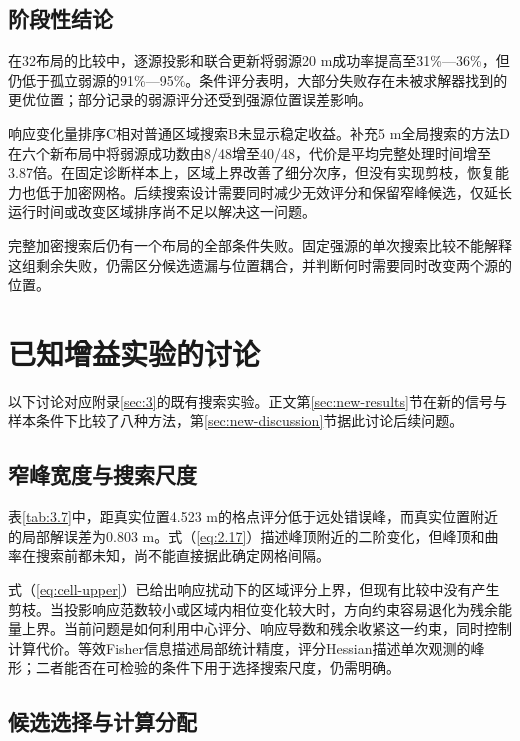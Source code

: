 \documentclass[11pt,a4paper]{article}
\numberwithin{equation}{section}
\numberwithin{figure}{section}
\numberwithin{table}{section}
\begin{document}
\subsection{阶段性结论}\label{sec:3.11}

在32布局的比较中，逐源投影和联合更新将弱源20 m成功率提高至31\%—36\%，但仍低于孤立弱源的91\%—95\%。条件评分表明，大部分失败存在未被求解器找到的更优位置；部分记录的弱源评分还受到强源位置误差影响。

响应变化量排序C相对普通区域搜索B未显示稳定收益。补充5 m全局搜索的方法D在六个新布局中将弱源成功数由8/48增至40/48，代价是平均完整处理时间增至3.87倍。在固定诊断样本上，区域上界改善了细分次序，但没有实现剪枝，恢复能力也低于加密网格。后续搜索设计需要同时减少无效评分和保留窄峰候选，仅延长运行时间或改变区域排序尚不足以解决这一问题。

完整加密搜索后仍有一个布局的全部条件失败。固定强源的单次搜索比较不能解释这组剩余失败，仍需区分候选遗漏与位置耦合，并判断何时需要同时改变两个源的位置。

\section{已知增益实验的讨论}\label{sec:4}

以下讨论对应附录\ref{sec:3}的既有搜索实验。正文第\ref{sec:new-results}节在新的信号与样本条件下比较了八种方法，第\ref{sec:new-discussion}节据此讨论后续问题。

\subsection{窄峰宽度与搜索尺度}\label{sec:4.1}

表\ref{tab:3.7}中，距真实位置4.523 m的格点评分低于远处错误峰，而真实位置附近的局部解误差为0.803 m。式（\ref{eq:2.17}）描述峰顶附近的二阶变化，但峰顶和曲率在搜索前都未知，尚不能直接据此确定网格间隔。

式（\ref{eq:cell-upper}）已给出响应扰动下的区域评分上界，但现有比较中没有产生剪枝。当投影响应范数较小或区域内相位变化较大时，方向约束容易退化为残余能量上界。当前问题是如何利用中心评分、响应导数和残余收紧这一约束，同时控制计算代价。等效Fisher信息描述局部统计精度，评分Hessian描述单次观测的峰形；二者能否在可检验的条件下用于选择搜索尺度，仍需明确。

\subsection{候选选择与计算分配}\label{sec:4.2}
\end{document}
